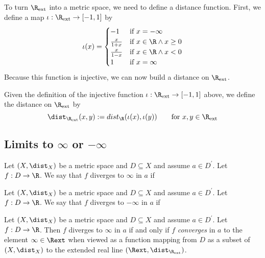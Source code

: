 To turn $\R_\text{ext}$ into a metric space, we need to define a distance function. First, we define a map $\iota: \R_\text{ext} \to [-1,1]$ by
$$\iota(x) = \begin{cases}
    -1 &\text{if } x = -\infty \\
    \frac{x}{1+x} &\text{if } x \in \R \land x \ge 0 \\
    \frac{x}{1-x} &\text{if } x \in \R \land x < 0 \\
    1 &\text{if } x = \infty
\end{cases}$$
Because this function is injective, we can now build a distance on $\R_\text{ext}$.

\begin{definition}
    Given the definition of the injective function $\iota: \R_\text{ext} \to [-1,1]$ above, we define the distance on
    $\R_\text{ext}$ by
    $$\dist_{\R_\text{ext}}(x,y) := dist_\R(\iota(x),\iota(y)) \qquad \text{for }x,y \in \R_\text{ext}$$
\end{definition}

\subsection{Limits to \texorpdfstring{$\infty$}{infinity} or \texorpdfstring{$-\infty$}{minus infinity}}
\begin{definition}
    Let $(X,\dist_X)$ be a metric space and $D \subseteq X$ and assume $a \in D^\prime$. Let $f: D \to \R$.
    We say that $f$ diverges to $\infty$ in $a$ if
    \begin{myCenter}
    \end{myCenter}
\end{definition}
\begin{definition}
    Let $(X,\dist_X)$ be a metric space and $D \subseteq X$ and assume $a \in D^\prime$. Let $f: D \to \R$.
    We say that $f$ diverges to $-\infty$ in $a$ if
    \begin{myCenter}
    \end{myCenter}
\end{definition}
\begin{proposition}
    Let $(X,\dist_X)$ be a metric space and $D \subseteq X$ and assume $a \in D^\prime$. Let $f: D \to \R$.
    Then $f$ diverges to $\infty$ in $a$ if and only if $f$ \emph{converges} in $a$ to the element $\infty \in \Rext$
    when viewed as a function mapping from $D$ as a subset of $(X,\dist_X)$ to the extended real line $(\Rext, \dist_{\R_\text{ext}})$.
\end{proposition}

